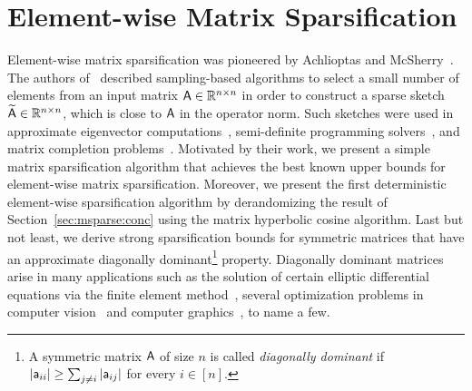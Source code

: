 %
%


%
%
%
\section{Element-wise Matrix Sparsification}
Element-wise matrix sparsification was pioneered by Achlioptas and McSherry~\cite{matrix:sparsification:AM01,matrix:sparsification:optas}. The authors of~\cite{matrix:sparsification:optas} described sampling-based algorithms to select a small number of elements from an input matrix ${\mathsf{A} } \in \mathbb{R}^{n \times n}$ in order to construct a sparse sketch $\widetilde{{\mathsf{A} }} \in \mathbb{R}^{n \times n}$, which is close to ${\mathsf{A} }$ in the operator norm. Such sketches were used in approximate eigenvector computations~\cite{matrix:sparsification:AM01,matrix:sparsification:arora,matrix:sparsification:optas}, semi-definite programming solvers~\cite{fast_SDP:AHK05,Asp09}, and matrix completion problems~\cite{CR09,CT09}. Motivated by their work, we present a simple matrix sparsification algorithm that achieves the best known upper bounds for element-wise matrix sparsification. Moreover, we present the first deterministic element-wise sparsification algorithm by derandomizing the result of Section~\ref{sec:msparse:conc} using the matrix hyperbolic cosine algorithm. Last but not least, we derive strong sparsification bounds for symmetric matrices that have an approximate diagonally dominant\footnote{A symmetric matrix ${\mathsf{A} }$ of size $n$ is called \emph{diagonally dominant} if $|{\mathsf{a} }_{ii}| \geq \sum_{j\neq i} |{\mathsf{a} }_{ij}|$ for every $i\in{[n]}$.} property. Diagonally dominant matrices arise in many applications such as the solution of certain elliptic differential equations via the finite element method~\cite{SDD:Vavasis}, several optimization problems in computer vision~\cite{SDD:vision:Koutis} and computer graphics~\cite{SDD:graphics:Joshi}, to name a few.




